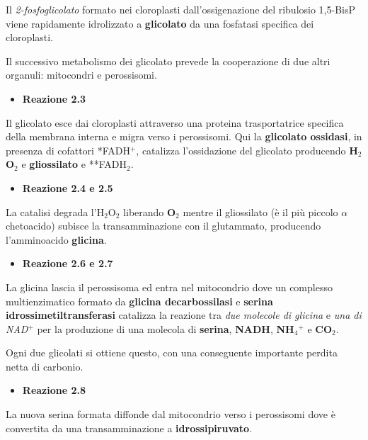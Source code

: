 \documentclass[]{article}
\begin{document}
Il \emph{2-fosfoglicolato} formato nei cloroplasti dall'ossigenazione
del ribulosio 1,5-BisP viene rapidamente idrolizzato a
\textbf{glicolato} da una fosfatasi specifica dei cloroplasti.

Il successivo metabolismo dei glicolato prevede la cooperazione di due
altri organuli: mitocondri e perossisomi.

\begin{itemize}
\itemsep1pt\parskip0pt
\item
  \textbf{Reazione 2.3}
\end{itemize}

Il glicolato esce dai cloroplasti attraverso una proteina trasportatrice
specifica della membrana interna e migra verso i perossisomi. Qui la
\textbf{glicolato ossidasi}, in presenza di cofattori *FADH$^+$,
catalizza l'ossidazione del glicolato producendo \textbf{H$_2$O$_2$} e
\textbf{gliossilato} e **FADH$_2$.

\begin{itemize}
\itemsep1pt\parskip0pt
\item
  \textbf{Reazione 2.4 e 2.5}
\end{itemize}

La catalisi degrada l'H$_2$O$_2$ liberando \textbf{O$_2$} mentre il
gliossilato (è il più piccolo $\alpha$chetoacido) subisce la
transamminazione con il glutammato, producendo l'amminoacido
\textbf{glicina}.

\begin{itemize}
\itemsep1pt\parskip0pt
\item
  \textbf{Reazione 2.6 e 2.7}
\end{itemize}

La glicina lascia il perossisoma ed entra nel mitocondrio dove un
complesso multienzimatico formato da \textbf{glicina decarbossilasi} e
\textbf{serina idrossimetiltransferasi} catalizza la reazione tra
\emph{due molecole di glicina} e \emph{una di NAD$^+$} per la produzione
di una molecola di \textbf{serina}, \textbf{NADH}, \textbf{NH$_4$$^+$} e
\textbf{CO$_2$}.

Ogni due glicolati si ottiene questo, con una conseguente importante
perdita netta di carbonio.

\begin{itemize}
\itemsep1pt\parskip0pt
\item
  \textbf{Reazione 2.8}
\end{itemize}

La nuova serina formata diffonde dal mitocondrio verso i perossisomi
dove è convertita da una transamminazione a \textbf{idrossipiruvato}.
\end{document}
